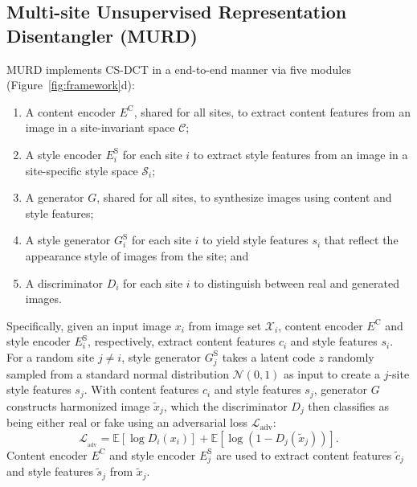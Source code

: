\documentclass{nature}
\begin{document}
\begin{methods}
\subsection{Multi-site Unsupervised Representation Disentangler (MURD)}
MURD implements CS-DCT in a end-to-end manner via five modules (Figure~\ref{fig:framework}d): 
\begin{enumerate}[itemsep=0pt,topsep=0pt,partopsep=0pt,parsep=0pt,label=(\roman{enumi})]
\item A content encoder $E^{\text{C}}$, shared for all sites, to extract content features from an image in a site-invariant space $\mathcal{C}$;
\item A style encoder $E^{\text{S}}_i$ for each site $i$ to extract style features from an image in a site-specific style space $\mathcal{S}_i$;
\item A generator $G$, shared for all sites, to synthesize images using content and style features;
\item A style generator $G^{\text{S}}_i$ for each site $i$ to yield style features $s_i$ that reflect the appearance style of images from the site;
and 
\item A discriminator $D_i$ for each site $i$ to distinguish between real and generated images.
\end{enumerate}
Specifically, given an input image $x_i$ from image set $\mathcal{X}_i$, content encoder $E^{\text{C}}$ and style encoder $E^{\text{S}}_i$, respectively, extract content features $c_i$ and style features $s_i$.
For a random site $j\neq i$, style generator $G^{\text{S}}_j$ takes a latent code $z$ randomly sampled from a standard normal distribution $\mathcal{N}(0,1)$ as input to create a $j$-site style features $s_j$.
With content features $c_i$ and style features $s_j$, generator $G$ constructs harmonized image $\tilde{x}_j$, which the discriminator $D_j$ then classifies as being either real or fake using an adversarial loss $\mathcal{L}_\textrm{adv}$:
\begin{equation}
\mathcal{L}_{_\textrm{adv}}=\mathbb{E}[\log D_i(x_i)]+\mathbb{E}[\log(1-D_j(\tilde{x}_j))].
\end{equation}
Content encoder $E^{\text{C}}$ and style encoder $E^{\text{S}}_j$ are used to extract content features $\tilde{c}_j$ and style features $\tilde{s}_j$ from $\tilde{x}_j$.

\end{methods}
\end{document}
